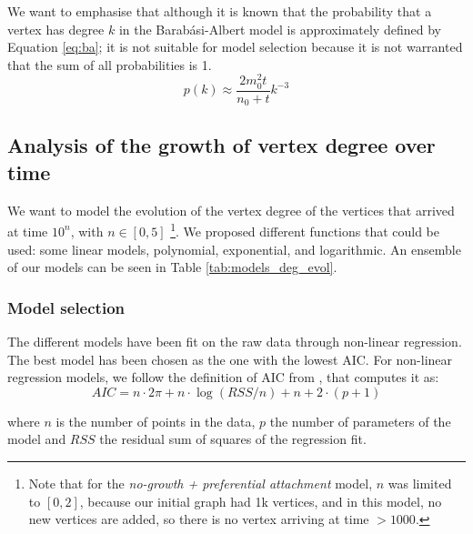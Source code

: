 We want to emphasise that although it is known that the probability that a vertex has degree $k$ in the Barabási-Albert model is approximately defined by Equation \ref{eq:ba}\cite{Caldarelli2007}; it is not suitable for model selection because it is not warranted that the sum of all probabilities is 1.
\begin{equation}
    p(k) \approx \frac{2m_0^2t}{n_0+t}k^{-3} \label{eq:ba}
\end{equation}

\subsection{Analysis of the growth of vertex degree over time}\label{sec:mod_scaling}
We want to model the evolution of the vertex degree of the vertices that arrived at time $10^n$, with $n \in [0,5]$ \footnote{Note that for the \textit{no-growth + preferential attachment} model, $n$ was limited to $[0,2]$, because our initial graph had 1k vertices, and in this model, no new vertices are added, so there is no vertex arriving at time $>1000$.}. We proposed different functions that could be used: some linear models, polynomial, exponential, and logarithmic. An ensemble of our models can be seen in Table \ref{tab:models_deg_evol}. 



\subsubsection{Model selection}

The different models have been fit on the raw data through non-linear regression. The best model has been chosen as the one with the lowest AIC. For non-linear regression models, we follow the definition of AIC from \cite{NonLinearR}, that computes it as:
\begin{equation}
    AIC = n \cdot 2\pi + n \cdot \log(RSS/n) + n + 2\cdot (p+1)
\end{equation}

where $n$ is the number of points in the data, $p$ the number of parameters of the model and $RSS$ the residual sum of squares of the regression fit.